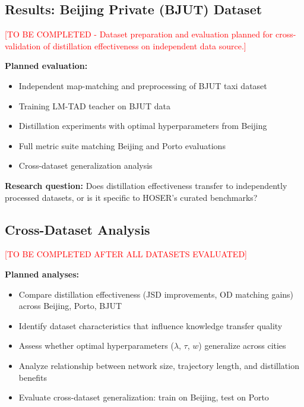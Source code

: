 \subsection{Results: Beijing Private (BJUT) Dataset}
\label{sec:eval-bjut}

\textcolor{red}{[TO BE COMPLETED - Dataset preparation and evaluation planned for cross-validation of distillation effectiveness on independent data source.]}

\textbf{Planned evaluation:}
\begin{itemize}[noitemsep,topsep=0pt]
    \item Independent map-matching and preprocessing of BJUT taxi dataset
    \item Training LM-TAD teacher on BJUT data
    \item Distillation experiments with optimal hyperparameters from Beijing
    \item Full metric suite matching Beijing and Porto evaluations
    \item Cross-dataset generalization analysis
\end{itemize}

\textbf{Research question:} Does distillation effectiveness transfer to independently processed datasets, or is it specific to HOSER's curated benchmarks?

\subsection{Cross-Dataset Analysis}
\label{sec:eval-cross}

\textcolor{red}{[TO BE COMPLETED AFTER ALL DATASETS EVALUATED]}

\textbf{Planned analyses:}
\begin{itemize}[noitemsep,topsep=0pt]
    \item Compare distillation effectiveness (JSD improvements, OD matching gains) across Beijing, Porto, BJUT
    \item Identify dataset characteristics that influence knowledge transfer quality
    \item Assess whether optimal hyperparameters ($\lambda$, $\tau$, $w$) generalize across cities
    \item Analyze relationship between network size, trajectory length, and distillation benefits
    \item Evaluate cross-dataset generalization: train on Beijing, test on Porto
\end{itemize}

